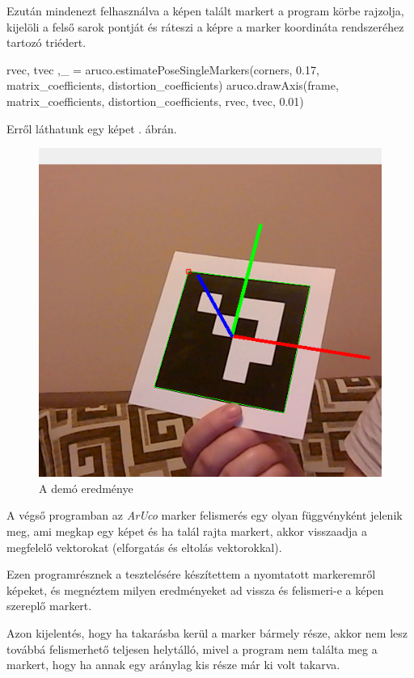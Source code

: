 Ezután  mindenezt felhasználva a képen talált markert a program  körbe rajzolja, kijelöli a felső sarok pontját és ráteszi a képre a marker koordináta rendszeréhez tartozó triédert.
\begin{python}
rvec, tvec ,_ = aruco.estimatePoseSingleMarkers(corners,
0.17, matrix_coefficients, distortion_coefficients)
aruco.drawAxis(frame, matrix_coefficients, distortion_coefficients,
rvec, tvec, 0.01)
\end{python}
Erről láthatunk egy képet . ábrán.
\begin{figure}[htp]
    \centering
   	\includegraphics[scale=0.6]{images/felismeres_aruco.png}
	\caption{A demó eredménye}
	\label{fig:felismeres_aruco}
\end{figure}


A végső programban az \textit{ArUco} marker felismerés egy olyan függvényként jelenik meg, ami megkap egy képet és ha talál rajta markert, akkor visszaadja a megfelelő vektorokat (elforgatás és eltolás vektorokkal).

Ezen programrésznek a tesztelésére készítettem a nyomtatott markeremről képeket, és megnéztem milyen eredményeket ad vissza és felismeri-e a képen szereplő markert.

Azon kijelentés, hogy ha takarásba kerül a marker bármely része, akkor nem lesz továbbá felismerhető teljesen helytálló, mivel a program nem találta meg a markert, hogy ha annak egy aránylag kis része már ki volt takarva.

